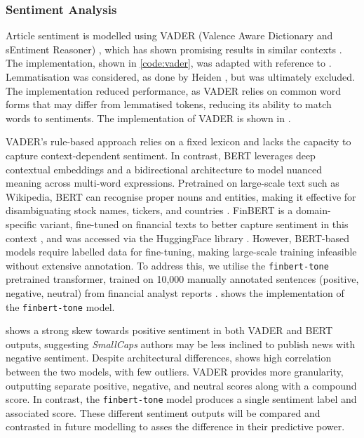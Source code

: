 \subsubsection{Sentiment Analysis}

Article sentiment is modelled using VADER (Valence Aware Dictionary and sEntiment Reasoner) \cite{vader_paper}, which has shown promising results in similar contexts \cite{heiden_lstm}. The implementation, shown in \cref{code:vader}, was adapted with reference to \cite{geeksforgeeks_vader}. Lemmatisation was considered, as done by Heiden \cite{heiden_lstm}, but was ultimately excluded. The  implementation reduced performance, as VADER relies on common word forms that may differ from lemmatised tokens, reducing its ability to match words to sentiments. The implementation of VADER is shown in . 



VADER's rule-based approach relies on a fixed lexicon and lacks the capacity to capture context-dependent sentiment. In contrast, BERT leverages deep contextual embeddings and a bidirectional architecture to model nuanced meaning across multi-word expressions. Pretrained on large-scale text such as Wikipedia, BERT can recognise proper nouns and entities, making it effective for disambiguating stock names, tickers, and countries \cite{bert_paper}. FinBERT is a domain-specific variant, fine-tuned on financial texts to better capture sentiment in this context \cite{araci_finbert}, and was accessed via the HuggingFace library \cite{prosusai_finbert}. However, BERT-based models require labelled data for fine-tuning, making large-scale training infeasible without extensive annotation. To address this, we utilise the \texttt{finbert-tone} pretrained transformer, trained on 10{,}000 manually annotated sentences (positive, negative, neutral) from financial analyst reports \cite{finbert_tone_sentiment}.  shows the implementation of the \texttt{finbert-tone} model.




 shows a strong skew towards positive sentiment in both VADER and BERT outputs, suggesting \textit{SmallCaps} authors may be less inclined to publish news with negative sentiment. Despite architectural differences,  shows high correlation between the two models, with few outliers. VADER provides more granularity, outputting separate positive, negative, and neutral scores along with a compound score. In contrast, the \texttt{finbert-tone} model produces a single sentiment label and associated score. These different sentiment outputs will be compared and contrasted in future modelling to asses the difference in their predictive power.



